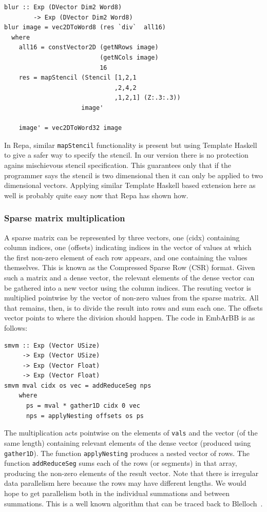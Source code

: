 \begin{verbatim} 
blur :: Exp (DVector Dim2 Word8) 
        -> Exp (DVector Dim2 Word8) 
blur image = vec2DToWord8 (res `div`  all16) 
  where 
    all16 = constVector2D (getNRows image) 
                          (getNCols image)
                          16
    res = mapStencil (Stencil [1,2,1
                              ,2,4,2   
                              ,1,2,1] (Z:.3:.3)) 
                     image' 
     
    image' = vec2DToWord32 image        
\end{verbatim}

In Repa, similar {\tt mapStencil} functionality is present but using Template 
Haskell to give a safer way to specify the stencil. In our version there is 
no protection agains mischievous stencil specification. This guarantees only
that if the programmer says the stencil is two dimensional then it can only 
be applied to two dimensional vectors. Applying similar Template Haskell based
extension here as well is probably quite easy now that Repa has shown how.

\subsubsection{Sparse matrix multiplication}\label{sec:smvm}
A sparse matrix can be represented by three vectors, one (cidx) containing
column indices, one (offsets) indicating indices in the vector of values
at which the first non-zero element of each row appears, and one containing the
values themselves. This is known as the Compressed Sparse Row (CSR) format.
Given such a matrix and a dense vector, the relevant elements of the dense vector
can be gathered into a new vector using the column indices. The resuting vector
is multiplied pointwise by the vector of non-zero values from the sparse matrix. All that remains, then, is to divide the result into rows and sum each one. The offsets vector
points to where the division should happen.
The code in EmbArBB is as follows:

\begin{verbatim} 
smvm :: Exp (Vector USize)
     -> Exp (Vector USize)
     -> Exp (Vector Float)
     -> Exp (Vector Float)
smvm mval cidx os vec = addReduceSeg nps 
    where 
      ps = mval * gather1D cidx 0 vec
      nps = applyNesting offsets os ps 
\end{verbatim} 

The multiplication acts pointwise on the elements of {\tt vals}
and the vector (of the same length) containing relevant elements of the dense vector (produced using {\tt gather1D}).
The function {\tt applyNesting} produces
a nested vector of rows. The function {\tt addReduceSeg} sums each
of the rows (or segments) in that array, producing the non-zero elements
of the result vector. Note that there is irregular data parallelism
here because the rows may have different lengths. We would hope
to get parallelism both in the individual summations and between summations.
This is a well known algorithm that can be traced back to Blelloch~.

